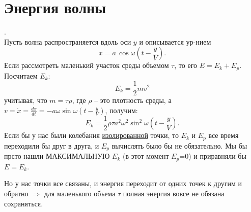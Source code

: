 \section{Энергия волны}.\\

Пусть волна распространяется вдоль оси $y$ и описывается ур-нием
\begin{displaymath}
x=a\,\cos \omega\left(t-\frac yV\right).
\end{displaymath}
Если рассмотреть маленький участок среды объемом $\tau$, то его $E=E_k+E_p$. Посчитаем $E_k$:
\begin{displaymath}
E_k=\frac12mv^2
\end{displaymath}
учитывая, что $m=\tau\rho$, где $\rho$ -- это плотность среды, а $v=\dot{x}=\frac{dx}{dt}=-a\omega\sin \omega\left(t-\frac yV\right)$, получим:
\begin{displaymath}
E_k=\frac12\rho\tau a^2\omega^2 \sin^2 \omega\left(t-\frac yV\right).
\end{displaymath}
Если бы у нас были колебания \underline{изолированной} точки, то $E_k$ и $E_p$ все время переходили бы друг в друга, и $E_p$ вычислять было бы не обязательно. Мы бы прсто нашли МАКСИМАЛЬНУЮ $E_k$ (в этот момент $E_p$=0) и приравняли бы $E=E_k$.

Но у нас точки все связаны, и энергия переходит от одних точек к другим и обратно $\Rightarrow$ для маленького объема $\tau$ полная энергия вовсе не обязана сохраняться.

